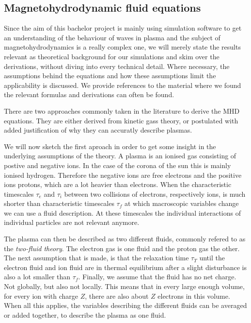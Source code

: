 \subsection{Magnetohydrodynamic fluid equations}
Since the aim of this bachelor project is mainly using simulation software to get an understanding of the behaviour of waves in plasma and the subject of magnetohydrodynamics is a really complex one,
we will merely state the results relevant as theoretical background for our simulations and skim over the derivations, without diving into every technical detail.
Where necessary, the assumptions behind the equations and how these assumptions limit the applicability is discussed.
We provide references to the material where we found the relevant formulas and derivations can often be found.

There are two approaches commonly taken in the literature to derive the MHD equations. They are either derived from kinetic gass theory, or postulated with added justification of why they can accuratly describe plasmas.

We will now sketch the first aproach in order to get some insight in the underlying assumptions of the theory.
A plasma is an ionised gas consisting of postive and negative ions. In the case of the corona of the sun this is mainly ionised hydrogen.
Therefore the negative ions are free electrons and the positive ions protons, which are a lot heavier than electrons.
When the characteristic timescales $\tau_e$ and $\tau_i$ between two collisions of electrons, respectively ions, is much shorter than characteristic timescales $\tau_f$ at which macroscopic variables change we can use a fluid description. 
At these timescales the individual interactions of individual particles are not relevant anymore.

The plasma can then be described as two different fluids, commonly refered to as the \emph{two-fluid theory}.
The electron gas is one fluid and the proton gas the other. 
The next assumption that is made, is that the relaxation time $\tau_T$ until the electron fluid and ion fluid are in thermal equilibrium after a slight disturbance is also a lot smaller than $\tau_f$.
Finally, we assume that the fluid has no net charge. Not globally, but also not locally. 
This means that in every large enough volume, for every ion with charge $Z$, there are also about $Z$ electrons in this volume.
When all this applies, the variables describing the different fluids can be averaged or added together, to describe the plasma as one fluid.

